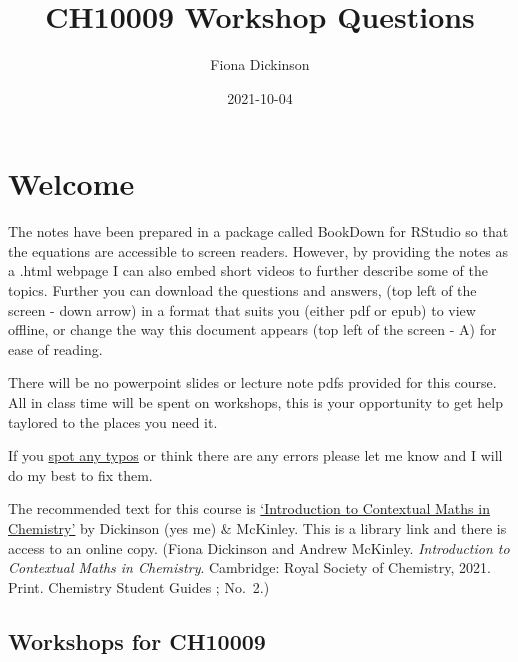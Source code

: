 \documentclass[
]{book}
\title{CH10009 Workshop Questions}
\author{Fiona Dickinson}
\date{2021-10-04}
\begin{document}
\maketitle

{
\setcounter{tocdepth}{1}
\tableofcontents
}
\hypertarget{welcome}{%
\chapter*{Welcome}\label{welcome}}

The notes have been prepared in a package called BookDown for RStudio so that the equations are accessible to screen readers. However, by providing the notes as a .html webpage I can also embed short videos to further describe some of the topics. Further you can download the questions and answers, (top left of the screen - down arrow) in a format that suits you (either pdf or epub) to view offline, or change the way this document appears (top left of the screen - A) for ease of reading.

There will be no powerpoint slides or lecture note pdfs provided for this course. All in class time will be spent on workshops, this is your opportunity to get help taylored to the places you need it.

If you \href{https://docs.google.com/forms/d/1hxCt8XcQ8taLXfymZfl2LUOjHACQ4INnRK6GeArTxsc/edit}{spot any typos} or think there are any errors please let me know and I will do my best to fix them.

The recommended text for this course is \href{https://bath-ac-primo.hosted.exlibrisgroup.com/primo-explore/fulldisplay?docid=44BAT_ALMA_DS51100784580002761\&context=L\&vid=44BAT_VU1\&lang=en_US\&search_scope=CSCOP_44BAT_DEEP\&adaptor=Local\%20Search\%20Engine\&tab=local\&query=any,contains,contextual\%20maths\%20in\%20chemistry\&sortby=rank\&pcAvailability=false}{`Introduction to Contextual Maths in Chemistry'} by Dickinson (yes me) \& McKinley. This is a library link and there is access to an online copy. (Fiona Dickinson and Andrew McKinley. \emph{Introduction to Contextual Maths in Chemistry}. Cambridge: Royal Society of Chemistry, 2021. Print. Chemistry Student Guides ; No.~2.)

\hypertarget{workshops-for-ch10009}{%
\section*{Workshops for CH10009}\label{workshops-for-ch10009}}
\end{document}
